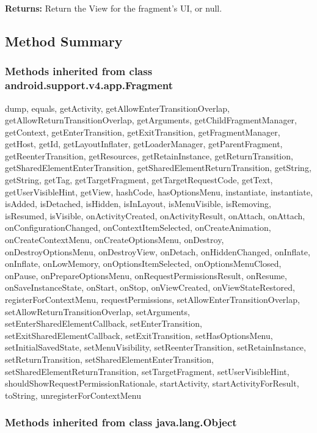 \textbf{Returns:}
\tab                Return the View for the fragment's UI, or null.\\


\subsection{Method Summary}

\subsubsection{Methods inherited from class android.support.v4.app.Fragment}

dump, equals, getActivity, getAllowEnterTransitionOverlap, getAllowReturnTransitionOverlap, getArguments, getChildFragmentManager, getContext, getEnterTransition, getExitTransition, getFragmentManager, getHost, getId, getLayoutInflater, getLoaderManager, getParentFragment, getReenterTransition, getResources, getRetainInstance, getReturnTransition, getSharedElementEnterTransition, getSharedElementReturnTransition, getString, getString, getTag, getTargetFragment, getTargetRequestCode, getText, getUserVisibleHint, getView, hashCode, hasOptionsMenu, instantiate, instantiate, isAdded, isDetached, isHidden, isInLayout, isMenuVisible, isRemoving, isResumed, isVisible, onActivityCreated, onActivityResult, onAttach, onAttach, onConfigurationChanged, onContextItemSelected, onCreateAnimation, onCreateContextMenu, onCreateOptionsMenu, onDestroy, onDestroyOptionsMenu, onDestroyView, onDetach, onHiddenChanged, onInflate, onInflate, onLowMemory, onOptionsItemSelected, onOptionsMenuClosed, onPause, onPrepareOptionsMenu, onRequestPermissionsResult, onResume, onSaveInstanceState, onStart, onStop, onViewCreated, onViewStateRestored, registerForContextMenu, requestPermissions, setAllowEnterTransitionOverlap, setAllowReturnTransitionOverlap, setArguments, setEnterSharedElementCallback, setEnterTransition, setExitSharedElementCallback, setExitTransition, setHasOptionsMenu, setInitialSavedState, setMenuVisibility, setReenterTransition, setRetainInstance, setReturnTransition, setSharedElementEnterTransition, setSharedElementReturnTransition, setTargetFragment, setUserVisibleHint, shouldShowRequestPermissionRationale, startActivity, startActivityForResult, toString, unregisterForContextMenu\\

\subsubsection{Methods inherited from class java.lang.Object}


